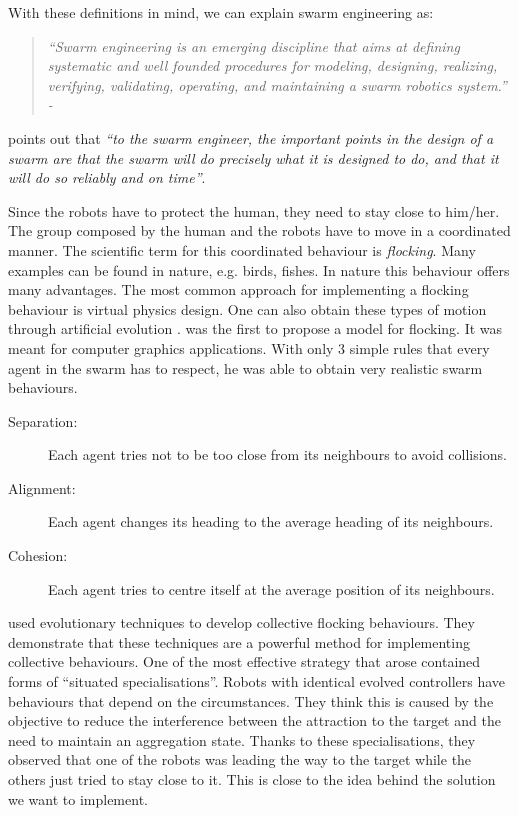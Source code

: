 \documentclass[oneside, a4paper, 12pt]{memoir}
\newcommand{\quoto}[2]{
\begin{quotation}
\textit{\enquote{#1} - #2}
\end{quotation}
}
\newcommand{\quot}[1]{\textit{\enquote{#1}}}
\begin{document}
		With these definitions in mind, we can explain swarm engineering as:
		\quoto{Swarm engineering is an emerging discipline that aims at defining systematic and well founded procedures for modeling, designing, realizing, verifying, validating, operating, and maintaining a swarm robotics system.}{\cite{brambilla2013swarm}}
		\citet{kazadi2000swarm} points out that \quot{to the swarm engineer, the important points in the design of a swarm are that the swarm will do precisely what it is designed to do, and that it will do so reliably and on time}.
		
		Since the robots have to protect the human, they need to stay close to him/her. The group composed by the human and the robots have to move in a coordinated manner. The scientific term for this coordinated behaviour is \emph{flocking}. Many examples can be found in nature, e.g. birds, fishes. In nature this behaviour offers many advantages. The most common approach for implementing a flocking behaviour is virtual physics design. One can also obtain these types of motion through artificial evolution \citep{brambilla2013swarm}. \citet{reynolds1987flocks} was the first to propose a model for flocking. It was meant for computer graphics applications. With only 3 simple rules that every agent in the swarm has to respect, he was able to obtain very realistic swarm behaviours.
		\begin{description}
			\item[Separation:] Each agent tries not to be too close from its neighbours to avoid collisions.
			\item[Alignment:] Each agent changes its heading to the average heading of its neighbours.
			\item[Cohesion:] Each agent tries to centre itself at the average position of its neighbours.
		\end{description}
		\citet{baldassarre2003evolving} used evolutionary techniques to develop collective flocking behaviours. They demonstrate that these techniques are a powerful method for implementing collective behaviours. One of the most effective strategy that arose contained forms of \enquote{situated specialisations}. Robots with identical evolved controllers have behaviours that depend on the circumstances. They think this is caused by the objective to reduce the interference between the attraction to the target and the need to maintain an aggregation state. Thanks to these specialisations, they observed that one of the robots was leading the way to the target while the others just tried to stay close to it. This is close to the idea behind the solution we want to implement.\\
\end{document}
